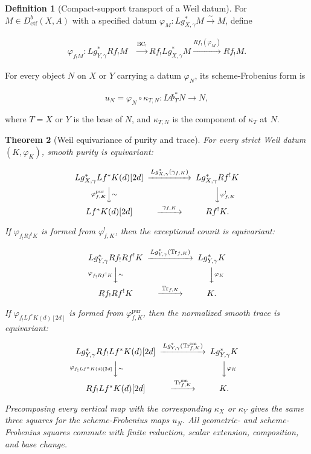 \documentclass[10pt]{article}
\newtheorem{theorem}{Theorem}[section]
\theoremstyle{definition}
\newtheorem{definition}[theorem]{Definition}
\newcommand{\Dctf}{D^b_{\mathrm{ctf}}}
\newcommand{\Tr}{\operatorname{Tr}}
\begin{document}
\begin{definition}[Compact-support transport of a Weil datum]
For \(M\in\Dctf(X,A)\) with a specified datum
\(\varphi_M:Lg_{X,\gamma}^*M\xrightarrow{\sim}M\), define

\[
\begin{aligned}
 \varphi_{f_!M}:Lg_{Y,\gamma}^*Rf_!M
 &\xrightarrow{\operatorname{BC}_!}
 Rf_!Lg_{X,\gamma}^*M
 \xrightarrow{Rf_!(\varphi_M)}Rf_!M.
\end{aligned}
\]

For every object \(N\) on \(X\) or \(Y\) carrying a datum \(\varphi_N\),
its scheme-Frobenius form is

\[
 u_N=\varphi_N\circ\kappa_{T,N}:L\Phi_T^*N\longrightarrow N,
\]

where \(T=X\) or \(Y\) is the base of \(N\), and \(\kappa_{T,N}\) is the
component of \(\kappa_T\) at \(N\).
\end{definition}

\begin{theorem}[Weil equivariance of purity and trace]
For every strict Weil datum \((K,\varphi_K)\), smooth purity is equivariant:

\[
\begin{CD}
Lg_{X,\gamma}^*Lf^*K(d)[2d]
 @>{Lg_{X,\gamma}^*(\gamma_{f,K})}>>
Lg_{X,\gamma}^*Rf^!K\\
@V{\varphi^{\mathrm{pur}}_{f,K}}V{\sim}V
@VV{\varphi^!_{f,K}}V\\
Lf^*K(d)[2d] @>{\gamma_{f,K}}>> Rf^!K.
\end{CD}
\]

If \(\varphi_{f_!Rf^!K}\) is formed from \(\varphi^!_{f,K}\), then the
exceptional counit is equivariant:

\[
\begin{CD}
Lg_{Y,\gamma}^*Rf_!Rf^!K
 @>{Lg_{Y,\gamma}^*(\Tr_{f,K})}>> Lg_{Y,\gamma}^*K\\
@V{\varphi_{f_!Rf^!K}}V{\sim}V @VV{\varphi_K}V\\
Rf_!Rf^!K @>{\Tr_{f,K}}>> K.
\end{CD}
\]

If \(\varphi_{f_!Lf^*K(d)[2d]}\) is formed from
\(\varphi^{\mathrm{pur}}_{f,K}\), then the normalized smooth trace is
equivariant:

\[
\begin{CD}
Lg_{Y,\gamma}^*Rf_!Lf^*K(d)[2d]
 @>{Lg_{Y,\gamma}^*(\Tr^{\mathrm{sm}}_{f,K})}>>
Lg_{Y,\gamma}^*K\\
@V{\varphi_{f_!Lf^*K(d)[2d]}}V{\sim}V @VV{\varphi_K}V\\
Rf_!Lf^*K(d)[2d] @>{\Tr^{\mathrm{sm}}_{f,K}}>> K.
\end{CD}
\]

Precomposing every vertical map with the corresponding \(\kappa_X\) or
\(\kappa_Y\) gives the same three squares for the scheme-Frobenius maps
\(u_N\).  All geometric- and scheme-Frobenius squares commute with finite
reduction, scalar extension, composition, and base change.
\end{theorem}
\end{document}
